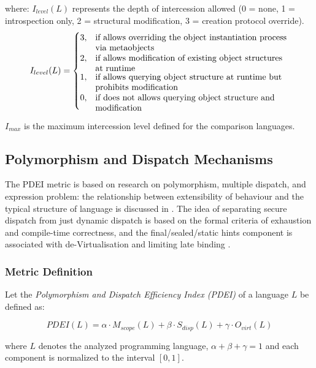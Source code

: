 where:
$I_{level}(L)$ represents the depth of intercession allowed (0 = none, 1 = introspection only, 2 = structural modification, 3 = creation protocol override).
\[
I_{level}(L) = 
\begin{cases}
    3, & \text{\parbox[t]{0.65\linewidth}{\raggedright
            if allows overriding the object instantiation process via metaobjects%
         }} \\
    2, & \text{\parbox[t]{0.65\linewidth}{\raggedright
            if allows modification of existing object structures at runtime%
         }} \\
    1, & \text{\parbox[t]{0.65\linewidth}{\raggedright
            if allows querying object structure at runtime but prohibits modification%
         }} \\
    0, & \text{\parbox[t]{0.65\linewidth}{\raggedright
            if does not allows querying object structure and modification%
         }}
\end{cases}
\]

$I_{max}$ is the maximum intercession level defined for the comparison languages.

\subsection{Polymorphism and Dispatch Mechanisms}

The PDEI metric is based on research on polymorphism, multiple dispatch, and expression problem: the relationship between extensibility of behaviour and the typical structure of language is discussed in \cite{castagna1995covariance}. The idea of separating secure dispatch from just dynamic dispatch is based on the formal criteria of exhaustion and compile-time correctness, and the final/sealed/static hints component is associated with de-Virtualisation and limiting late binding \cite{pierce2002types}.

\subsubsection{Metric Definition}

Let the \textit{Polymorphism and Dispatch Efficiency Index (PDEI)} of a language $L$ be defined as:

\[
    PDEI(L) = 
    \alpha \cdot M_{scope}(L) + 
    \beta \cdot S_{disp}(L) + 
    \gamma \cdot O_{virt}(L)
\]

where $L$ denotes the analyzed programming language, $\alpha + \beta + \gamma = 1$ and each component is normalized to the interval $[0,1]$.

